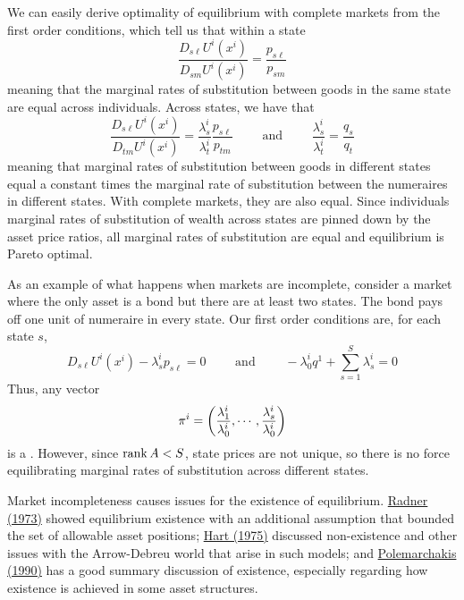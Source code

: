 \documentclass[10pt]{article}
\begin{document}
\begin{remark}
	We can easily derive optimality of equilibrium with complete markets from the first order conditions, which tell us that within a state \[\frac{D_{s\ell} U^i(x^i)}{D_{sm}U^i(x^i)} = \frac{p_{s\ell}}{p_{sm}}\]meaning that the marginal rates of substitution between goods in the same state are equal across individuals. Across states, we have that \[\frac{D_{s\ell} U^i(x^i)}{D_{tm}U^i(x^i)} = \frac{\lambda_s^i}{\lambda_t^i} \frac{p_{s\ell}}{p_{tm}} \qquad \text{ and } \qquad \frac{\lambda_s^i}{\lambda_t^i} = \frac{q_s}{q_t}\]meaning that marginal rates of substitution between goods in different states equal a constant times the marginal rate of substitution between the numeraires in different states. With complete markets, they are also equal. Since individuals marginal rates of substitution of wealth across states are pinned down by the asset price ratios, all marginal rates of substitution are equal and equilibrium is Pareto optimal. 
\end{remark}

\begin{remark}
As an example of what happens when markets are incomplete, consider a market where the only asset is a bond but there are at least two states. The bond pays off one unit of numeraire in every state. Our first order conditions are, for each state $s$,\[D_{s\ell}U^i(x^i) - \lambda_s^i p_{s\ell} = 0 \qquad \text{ and } \qquad -\lambda_0^i q^1 + \sum_{s=1}^S \lambda_s^i = 0\]Thus, any vector \[\pi^i = \left( \frac{\lambda_1^i}{\lambda_0^i},\cdots,\frac{\lambda_s^i}{\lambda_0^i}\right)\]is a . However, since $\mathop{\rm rank} A < S$, state prices are not unique, so there is no force equilibrating marginal rates of substitution across different states.
\end{remark}

\begin{remark}
	Market incompleteness causes issues for the existence of equilibrium. \href{https://www.jstor.org/stable/1909407}{Radner (1973)} showed equilibrium existence with an additional assumption that bounded the set of allowable asset positions; \href{https://www.sciencedirect.com/science/article/pii/0022053175900289}{Hart (1975)} discussed non-existence and other issues with the Arrow-Debreu world that arise in such models; and \href{https://www.jstor.org/stable/41953246?seq=1}{Polemarchakis (1990)} has a good summary discussion of existence, especially regarding how existence is achieved in some asset structures.
\end{remark}
\end{document}
